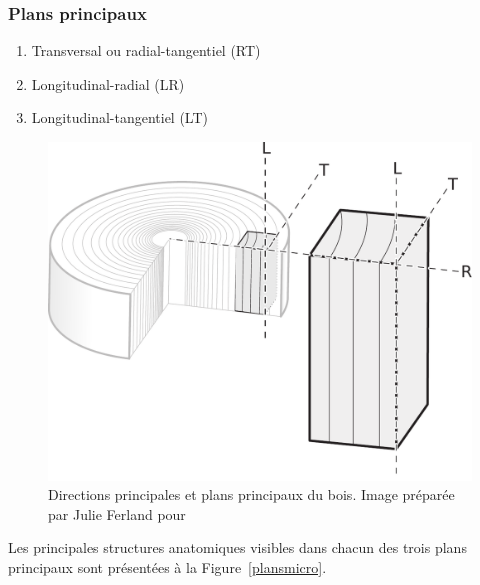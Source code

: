 \subsubsection{Plans principaux}

\begin{enumerate}
\item Transversal ou radial-tangentiel (RT)
\item Longitudinal-radial (LR)
\item Longitudinal-tangentiel (LT)
\end{enumerate}

\begin{figure}[p]
\centering
\includegraphics[scale=0.5]{img/ch1_orientation}
\caption{Directions principales et plans principaux du bois. Image préparée par Julie Ferland pour \cite{achim2010dendroecologie}}
\label{plans}
\end{figure}

Les principales structures anatomiques visibles dans chacun des trois plans principaux sont présentées à la Figure~\ref{plansmicro}.

